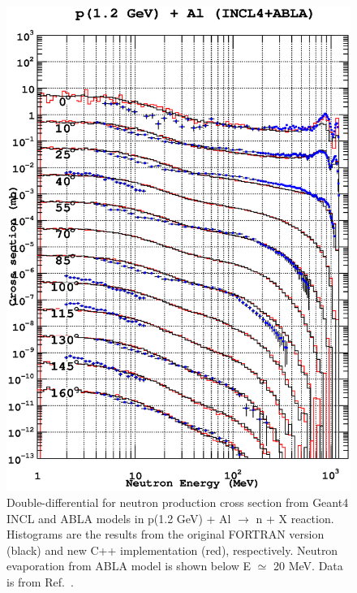 \documentclass[a4paper]{jpconf}
\begin{document}
\begin{figure}
\begin{center}
\includegraphics[scale=0.70]{images/proton1200MeVAl.eps}
\caption{\label{fig:neutronAl}Double-differential for neutron production cross section
    from Geant4 INCL and ABLA models in p(1.2 GeV) + Al $\rightarrow$ n + X reaction.
Histograms are the results from the original FORTRAN version (black) and new C++ implementation (red), respectively. 
Neutron evaporation from ABLA model is shown below E $\simeq$ 20 MeV.
Data is from Ref.~\cite{data}.} %

\end{center}

\end{figure}
\end{document}
